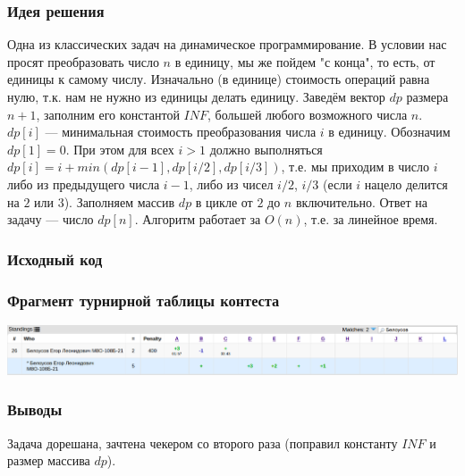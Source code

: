 \subsubsection*{Идея решения}

Одна из классических задач на динамическое программирование. В условии нас просят преобразовать число $n$ в единицу, мы же пойдем "с конца"{}, то есть, от единицы к самому числу. Изначально (в единице) стоимость операций равна нулю, т.к. нам не нужно из единицы делать единицу. Заведём вектор $dp$ размера $n + 1$, заполним его константой $INF$, большей любого возможного числа $n$. $dp[i]$ --- минимальная стоимость преобразования числа $i$ в единицу. Обозначим $dp[1] = 0$. При этом для всех $i > 1$ должно выполняться $dp[i] = i + min(dp[i - 1], dp[i / 2], dp[i / 3])$, т.е. мы приходим в число $i$ либо из предыдущего числа $i - 1$, либо из чисел $i / 2$, $i / 3$ (если $i$ нацело делится на $2$ или $3$). Заполняем массив $dp$ в цикле от $2$ до $n$ включительно. Ответ на задачу --- число $dp[n]$. Алгоритм работает за $O(n)$, т.е. за линейное время.

\subsubsection*{Исходный код}


\subsubsection*{Фрагмент турнирной таблицы контеста}
\begin{center}
\includegraphics[width=\textwidth]{standings/20220702/table.png}\newline\noindent
\end{center}

\subsubsection*{Выводы}

Задача дорешана, зачтена чекером со второго раза (поправил константу $INF$ и размер массива $dp$).

\pagebreak

